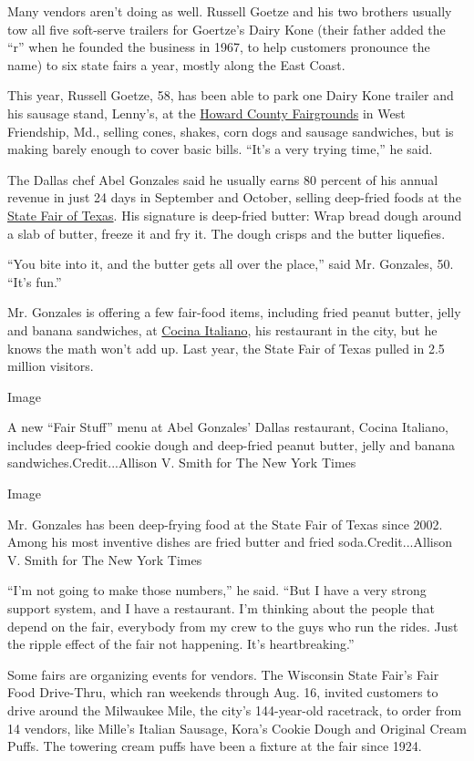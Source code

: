 Many vendors aren't doing as well. Russell Goetze and his two brothers
usually tow all five soft-serve trailers for Goertze's Dairy Kone (their
father added the ``r'' when he founded the business in 1967, to help
customers pronounce the name) to six state fairs a year, mostly along
the East Coast.

This year, Russell Goetze, 58, has been able to park one Dairy Kone
trailer and his sausage stand, Lenny's, at the
\href{https://howardcountyfairmd.com/}{Howard County Fairgrounds} in
West Friendship, Md., selling cones, shakes, corn dogs and sausage
sandwiches, but is making barely enough to cover basic bills. ``It's a
very trying time,'' he said.

The Dallas chef Abel Gonzales said he usually earns 80 percent of his
annual revenue in just 24 days in September and October, selling
deep-fried foods at the \href{https://bigtex.com/}{State Fair of Texas}.
His signature is deep-fried butter: Wrap bread dough around a slab of
butter, freeze it and fry it. The dough crisps and the butter liquefies.

``You bite into it, and the butter gets all over the place,'' said Mr.
Gonzales, 50. ``It's fun.''

Mr. Gonzales is offering a few fair-food items, including fried peanut
butter, jelly and banana sandwiches, at
\href{https://cocinaitaliano.com/}{Cocina Italiano}, his restaurant in
the city, but he knows the math won't add up. Last year, the State Fair
of Texas pulled in 2.5 million visitors.

Image

A new ``Fair Stuff'' menu at Abel Gonzales' Dallas restaurant, Cocina
Italiano, includes deep-fried cookie dough and deep-fried peanut butter,
jelly and banana sandwiches.Credit...Allison V. Smith for The New York
Times

Image

Mr. Gonzales has been deep-frying food at the State Fair of Texas since
2002. Among his most inventive dishes are fried butter and fried
soda.Credit...Allison V. Smith for The New York Times

``I'm not going to make those numbers,'' he said. ``But I have a very
strong support system, and I have a restaurant. I'm thinking about the
people that depend on the fair, everybody from my crew to the guys who
run the rides. Just the ripple effect of the fair not happening. It's
heartbreaking.''

Some fairs are organizing events for vendors. The Wisconsin State Fair's
Fair Food Drive-Thru, which ran weekends through Aug. 16, invited
customers to drive around the Milwaukee Mile, the city's 144-year-old
racetrack, to order from 14 vendors, like Mille's Italian Sausage,
Kora's Cookie Dough and Original Cream Puffs. The towering cream puffs
have been a fixture at the fair since 1924.

